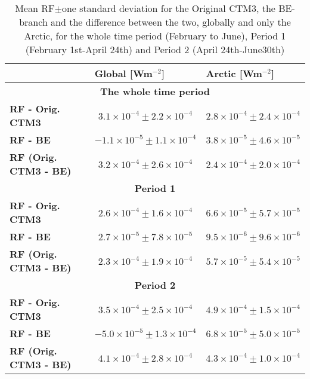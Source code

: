 \begin{table}[h]
\centering
\begin{tabular}{|l|c|c|}
\hline
\textbf{}                     & \multicolumn{1}{l|}{\textbf{Global {[}Wm$^{-2}${]}}} & \multicolumn{1}{l|}{\textbf{Arctic {[}Wm$^{-2}${]}}} \\ \hline
\multicolumn{3}{|c|}{\textbf{The whole time period}}                                                                                        \\ \hline
\textbf{RF - Orig. CTM3}      & $3.1\times10^{-4}\pm2.2\times10^{-4}$                & $2.8\times10^{-4}\pm2.4\times10^{-4}$                \\
\textbf{RF - BE}              & $-1.1\times10^{-5}\pm1.1\times10^{-4}$               & $3.8\times10^{-5}\pm4.6\times10^{-5}$                \\
\textbf{RF (Orig. CTM3 - BE)} & $3.2\times10^{-4}\pm2.6\times10^{-4}$                & $2.4\times10^{-4}\pm2.0\times10^{-4}$                \\ \hline
\multicolumn{3}{|c|}{\textbf{Period 1}}                                                                                                     \\ \hline
\textbf{RF - Orig. CTM3}      & $2.6\times10^{-4}\pm1.6\times10^{-4}$                & $6.6\times10^{-5}\pm5.7\times10^{-5}$                \\
\textbf{RF - BE}              & $2.7\times10^{-5}\pm7.8\times10^{-5}$                & $9.5\times10^{-6}\pm9.6\times10^{-6}$                \\
\textbf{RF (Orig. CTM3 - BE)} & $2.3\times10^{-4}\pm1.9\times10^{-4}$                & $5.7\times10^{-5}\pm5.4\times10^{-5}$                \\ \hline
\multicolumn{3}{|c|}{\textbf{Period 2}}                                                                                                     \\ \hline
\textbf{RF - Orig. CTM3}      & $3.5\times10^{-4}\pm2.5\times10^{-4}$                & $4.9\times10^{-4}\pm1.5\times10^{-4}$                \\
\textbf{RF - BE}              & $-5.0\times10^{-5}\pm1.3\times10^{-4}$               & $6.8\times10^{-5}\pm5.0\times10^{-5}$                \\
\textbf{RF (Orig. CTM3 - BE)} & $4.1\times10^{-4}\pm2.8\times10^{-4}$                & $4.3\times10^{-4}\pm1.0\times10^{-4}$                \\ \hline
\end{tabular}
\caption{Mean RF$\pm$one standard deviation for the Original CTM3, the BE-branch and the difference between the two, globally and only the Arctic, for the whole time period (February to June), Period 1 (February 1st-April 24th) and Period 2 (April 24th-June30th)}
\label{tab:RF_results}
\end{table}
